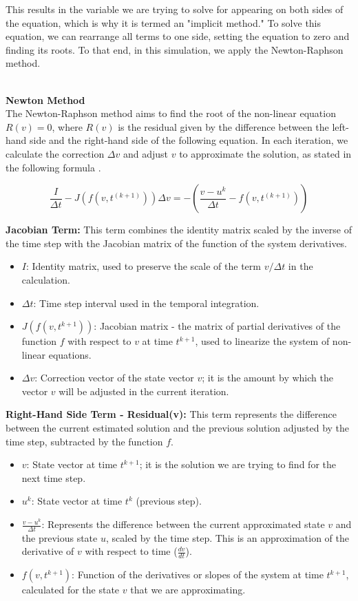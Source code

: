 \documentclass[runningheads]{llncs}
\begin{document}
This results in the variable we are trying to solve for appearing on both sides of the equation, which is why it is termed an "implicit method." To solve this equation, we can rearrange all terms to one side, setting the equation to zero and finding its roots. To that end, in this simulation, we apply the Newton-Raphson method.

\textbf{\\Newton Method\\}
The Newton-Raphson method aims to find the root of the non-linear equation \( R(v) = 0 \), where \( R(v) \) is the residual given by the difference between the left-hand side and the right-hand side of the following equation. In each iteration, we calculate the correction \( \Delta v \) and adjust \( v \) to approximate the solution, as stated in the following formula \cite{hornik_optimization}.

\begin{equation}
\frac{I}{\Delta t} - J(f(v,t^{(k+1)})) \Delta v = -\left(\frac{v - u^k}{\Delta t} - f(v, t^{(k+1)})\right)
\end{equation}

\textbf{Jacobian Term:}
This term combines the identity matrix scaled by the inverse of the time step with the Jacobian matrix of the function of the system derivatives.
\begin{itemize}
    \item \( I \): Identity matrix, used to preserve the scale of the term \( v/\Delta t \) in the calculation.
    \item \( \Delta t \): Time step interval used in the temporal integration.
    \item \( J(f(v, t^{k+1})) \): Jacobian matrix - the matrix of partial derivatives of the function \( f \) with respect to \( v \) at time \( t^{k+1} \), used to linearize the system of non-linear equations.
    \item \( \Delta v \): Correction vector of the state vector \( v \); it is the amount by which the vector \( v \) will be adjusted in the current iteration.
\end{itemize}

\textbf{Right-Hand Side Term - Residual(v):}
This term represents the difference between the current estimated solution and the previous solution adjusted by the time step, subtracted by the function \( f \).
\begin{itemize}
    \item \( v \): State vector at time \( t^{k+1} \); it is the solution we are trying to find for the next time step.
    \item \( u^k \): State vector at time \( t^k \) (previous step).
    \item \( \frac{v - u^k}{\Delta t} \): Represents the difference between the current approximated state \( v \) and the previous state \( u \), scaled by the time step. This is an approximation of the derivative of \( v \) with respect to time (\( \frac{dv}{dt} \)).
    \item \( f(v, t^{k+1}) \): Function of the derivatives or slopes of the system at time \( t^{k+1} \), calculated for the state \( v \) that we are approximating.
\end{itemize}
\end{document}
